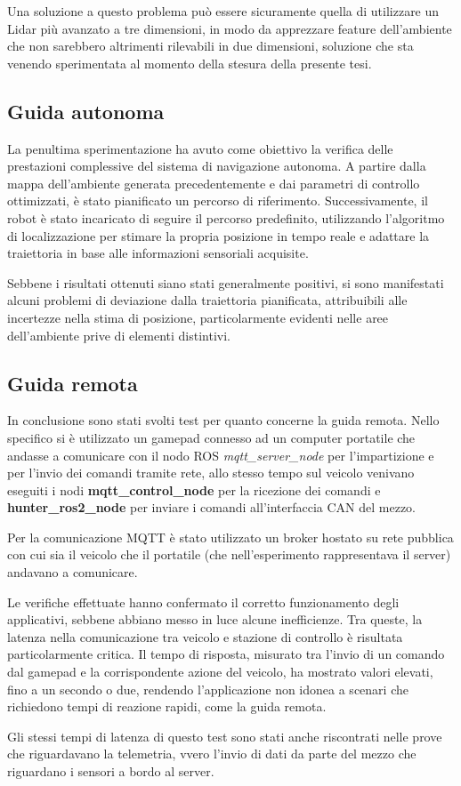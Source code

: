 \noindent Una soluzione a questo problema può essere sicuramente quella di utilizzare un Lidar più avanzato a tre dimensioni, in modo da apprezzare feature dell'ambiente che non sarebbero altrimenti rilevabili in due dimensioni, soluzione che sta venendo sperimentata al momento della stesura della presente tesi.

\subsection{Guida autonoma}
La penultima sperimentazione ha avuto come obiettivo la verifica delle prestazioni complessive del sistema di navigazione autonoma. A partire dalla mappa dell'ambiente generata precedentemente e dai parametri di controllo ottimizzati, è stato pianificato un percorso di riferimento. Successivamente, il robot è stato incaricato di seguire il percorso predefinito, utilizzando l'algoritmo di localizzazione per stimare la propria posizione in tempo reale e adattare la traiettoria in base alle informazioni sensoriali acquisite.

\noindent Sebbene i risultati ottenuti siano stati generalmente positivi, si sono manifestati alcuni problemi di deviazione dalla traiettoria pianificata, attribuibili alle incertezze nella stima di posizione, particolarmente evidenti nelle aree dell'ambiente prive di elementi distintivi.

\subsection{Guida remota}
In conclusione sono stati svolti test per quanto concerne la guida remota. Nello specifico si è utilizzato un gamepad connesso ad un computer portatile che andasse a comunicare con il nodo ROS \textit{mqtt\_server\_node} per l'impartizione e per l'invio dei comandi tramite rete, allo stesso tempo sul veicolo venivano eseguiti i nodi \textbf{mqtt\_control\_node} per la ricezione dei comandi e \textbf{hunter\_ros2\_node} per inviare i comandi all'interfaccia CAN del mezzo.

\noindent Per la comunicazione MQTT è stato utilizzato un broker hostato su rete pubblica con cui sia il veicolo che il portatile (che nell'esperimento rappresentava il server) andavano a comunicare. 

\noindent Le verifiche effettuate hanno confermato il corretto funzionamento degli applicativi, sebbene abbiano messo in luce alcune inefficienze. Tra queste, la latenza nella comunicazione tra veicolo e stazione di controllo è risultata particolarmente critica. Il tempo di risposta, misurato tra l'invio di un comando dal gamepad e la corrispondente azione del veicolo, ha mostrato valori elevati, fino a un secondo o due, rendendo l'applicazione non idonea a scenari che richiedono tempi di reazione rapidi, come la guida remota.

\noindent Gli stessi tempi di latenza di questo test sono stati anche riscontrati nelle prove che riguardavano la telemetria, vvero l'invio di dati da parte del mezzo che riguardano i sensori a bordo al server.
